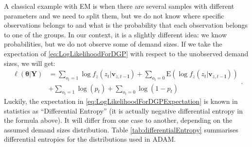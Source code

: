 \documentclass[
]{book}
\theoremstyle{definition}
\theoremstyle{definition}
\theoremstyle{definition}
\theoremstyle{definition}
\theoremstyle{remark}
\begin{document}
A classical example with EM is when there are several samples with different parameters and we need to split them, but we do not know where specific observations belongs to and what is the probability that each observation belongs to one of the groups. In our context, it is a slightly different idea: we know probabilities, but we do not observe some of demand sizes. If we take the expectation of \eqref{eq:LogLikelihoodForDGP} with respect to the unobserved demand sizes, we will get:
\begin{equation}
    \begin{aligned}
    \ell(\boldsymbol{\theta} | \textbf{Y}) & = \sum_{o_t=1} \log f_z \left(z_{t} | \mathbf{v}_{z,t-\boldsymbol{l}} \right) + \sum_{o_t=0} \text{E} \left( \log f_z \left(z_{t} | \mathbf{v}_{z,t-\boldsymbol{l}} \right) \right) \\
    & + \sum_{o_t=1} \log(p_t) + \sum_{o_t=0} \log(1- p_t)
    \end{aligned}.
    \label{eq:LogLikelihoodForDGPExpectation}
\end{equation}
Luckily, the expectation in \eqref{eq:LogLikelihoodForDGPExpectation} is known in statistics as ``Differential Entropy'' (it is actually negative differential entropy in the formula above). It will differ from one case to another, depending on the assumed demand sizes distribution. Table \ref{tab:differentialEntropy} summarises differential entropies for the distributions used in ADAM.
\end{document}
